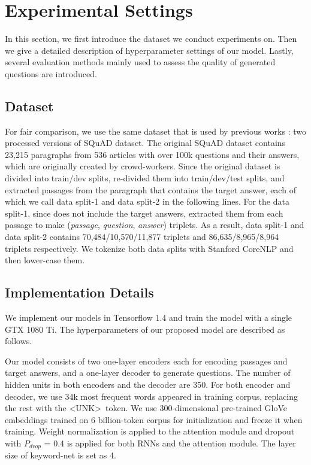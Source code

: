 \documentclass[letterpaper]{article} %
\begin{document}
\section{Experimental Settings}
In this section, we first introduce the dataset we conduct experiments on. Then we give a detailed description of hyperparameter settings of our model. Lastly, several evaluation methods mainly used to assess the quality of generated questions are introduced. 

\subsection{Dataset}
For fair comparison, we use the same dataset that is used by previous works \cite{du2017learning,zhou2017neural,song2018leveraging}: two processed versions of SQuAD\cite{rajpurkar2016squad} dataset. The original SQuAD dataset contains 23,215 paragraphs from 536 articles with over 100k questions and their answers, which are originally created by crowd-workers. Since the original dataset is divided into train/dev splits, \cite{du2017learning,zhou2017neural} re-divided them into train/dev/test splits, and extracted passages from the paragraph that contains the target answer, each of which we call data split-1 and data split-2 in the following lines.  For the data split-1, since \cite{du2017learning} does not include the target answers, \cite{song2018leveraging} extracted them from each passage to make (\textit{passage}, \textit{question}, \textit{answer}) triplets. As a result, data split-1 and data split-2 contains 70,484/10,570/11,877 triplets and 86,635/8,965/8,964 triplets respectively. We tokenize both data splits with Stanford CoreNLP \cite{manning2014stanford} and then lower-case them. 




\subsection{Implementation Details}
We implement our models in Tensorflow 1.4 and train the model with a single GTX 1080 Ti. The hyperparameters of our proposed model are described as follows.

Our model consists of two one-layer encoders each for encoding passages and target answers, and a one-layer decoder to generate questions. The number of hidden units in both encoders and the decoder are 350. For both encoder and decoder, we use 34k most frequent words appeared in training corpus, replacing the rest with the \textless UNK\textgreater\ token. We use 300-dimensional pre-trained GloVe \cite{pennington2014glove} embeddings trained on 6 billion-token corpus for initialization and freeze it when training. Weight normalization is applied to the attention module and dropout with \(P_{drop}\) = 0.4 is applied for both RNNs and the attention module. The layer size of keyword-net is set as 4. 
\end{document}
